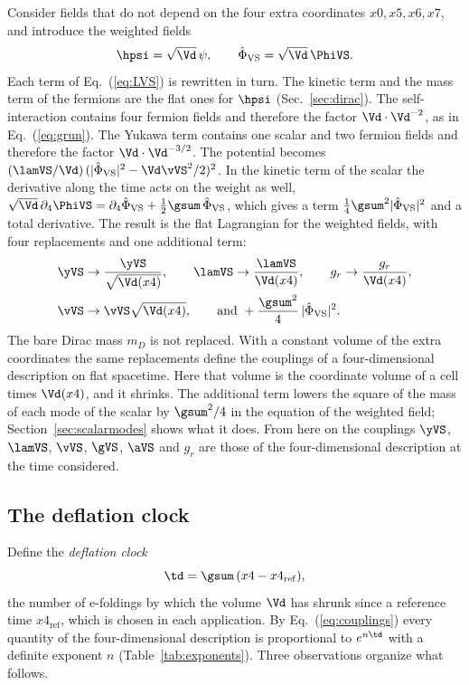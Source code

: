 Consider fields that do not depend on the four extra coordinates
$x0,x5,x6,x7$, and introduce the weighted fields
\begin{equation}
\hpsi=\sqrt{\Vd}\,\psi,\qquad\hat\Phi_{\mathrm{VS}}=\sqrt{\Vd}\,\PhiVS .
\end{equation}
Each term of Eq.~(\ref{eq:LVS}) is rewritten in turn. The kinetic term and the mass term of the
fermions are the flat ones for $\hpsi$ (Sec.~\ref{sec:dirac}). The self-interaction contains four
fermion fields and therefore the factor $\Vd\cdot\Vd^{-2}$, as in Eq.~(\ref{eq:grun}). The Yukawa
term contains one scalar and two fermion fields
and therefore the factor $\Vd\cdot\Vd^{-3/2}$. The potential becomes
$(\lamVS/\Vd)\,(|\hat\Phi_{\mathrm{VS}}|^{2}-\Vd\vVS^{2}/2)^{2}$. In the kinetic term of the scalar the
derivative along the time acts on the weight as well,
$\sqrt{\Vd}\,\partial_4\PhiVS=\partial_4\hat\Phi_{\mathrm{VS}}+\tfrac12\gsum\,\hat\Phi_{\mathrm{VS}}$,
which gives a term $\tfrac14\gsum^{2}|\hat\Phi_{\mathrm{VS}}|^{2}$ and a total derivative. The result
is the flat Lagrangian for the weighted fields, with four replacements and one additional term:
\begin{equation}
\begin{aligned}
&\yVS\to\frac{\yVS}{\sqrt{\Vd(x4)}},\qquad\lamVS\to\frac{\lamVS}{\Vd(x4)},\qquad g_r\to\frac{g_r}{\Vd(x4)},\\
&\vVS\to\vVS\sqrt{\Vd(x4)},\qquad\text{and }+\frac{\gsum^{2}}{4}\,|\hat\Phi_{\mathrm{VS}}|^{2}.
\end{aligned}
\label{eq:couplings}
\end{equation}
The bare Dirac mass $m_D$ is not replaced. With a constant volume of the extra coordinates the same
replacements define the couplings of a four-dimensional description on flat spacetime. Here that
volume is the coordinate volume of a cell times $\Vd(x4)$, and it shrinks. The additional term lowers the square of
the mass of each mode of the scalar by $\gsum^{2}/4$ in the equation of the weighted field;
Section~\ref{sec:scalarmodes} shows what it does. From here on the couplings $\yVS$, $\lamVS$,
$\vVS$, $\gVS$, $\aVS$ and $g_r$ are those of the four-dimensional description at the time
considered.

\subsection{The deflation clock}

Define the \emph{deflation clock}
\begin{equation}
\td=\gsum\,(x4-x4_{\mathrm{ref}}),
\label{eq:clock}
\end{equation}
the number of e-foldings by which the volume $\Vd$ has shrunk since a reference time
$x4_{\mathrm{ref}}$, which is chosen in each application. By Eq.~(\ref{eq:couplings}) every quantity
of the four-dimensional description is proportional to $e^{n\td}$ with a definite exponent $n$
(Table~\ref{tab:exponents}). Three observations organize what follows.


